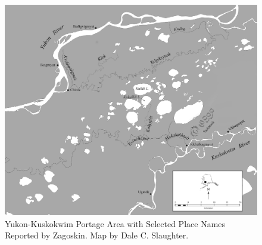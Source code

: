 \begin{figure}[ht]
    \centering
    \includegraphics[width=\textwidth]{figures/pratt-fig5.png}
\caption{Yukon-Kuskokwim Portage Area with Selected Place Names Reported by Zagoskin. Map by Dale C. Slaughter.}
\label{pratt-fig5}
\end{figure}
